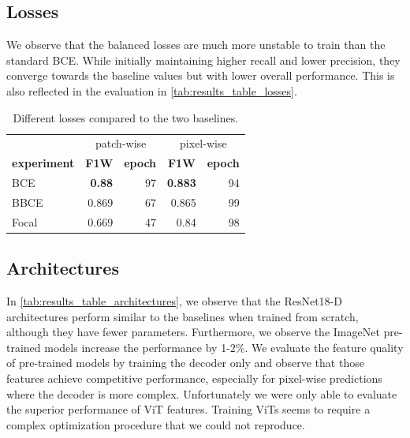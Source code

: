 \documentclass[10pt,conference,compsocconf]{IEEEtran}
\begin{document}
\subsection{Losses}
We observe that the balanced losses are much more unstable to train than the standard BCE. While initially maintaining higher recall and lower precision, they converge towards the baseline values but with lower overall performance. This is also reflected in the evaluation in \autoref{tab:results_table_losses}.
\begin{table}[ht!]
    \centering
    \begin{tabular}{l|rr|rr}
        \toprule
        \multicolumn{1}{c}{} &
        \multicolumn{2}{c}{patch-wise} &
        \multicolumn{2}{c}{pixel-wise} \\
        \multicolumn{1}{c}{\textbf{experiment}} &
        \multicolumn{1}{c}{\textbf{F1W}} &
        \multicolumn{1}{c}{\textbf{epoch}} &
        \multicolumn{1}{c}{\textbf{F1W}} &
        \multicolumn{1}{c}{\textbf{epoch}} \\
        \midrule
            BCE & \textbf{0.88} & 97 & \textbf{0.883} & 94 \\
            BBCE & 0.869 & 67 & 0.865 & 99 \\
            Focal & 0.669 & 47 & 0.84 & 98 \\
        \bottomrule
    \end{tabular}
    \caption{Different losses compared to the two baselines.}
    \label{tab:results_table_losses}
    \vspace{-0.5cm}
\end{table}

\subsection{Architectures}
In \autoref{tab:results_table_architectures}, we observe that the ResNet18-D architectures perform similar to the baselines when trained from scratch, although they have fewer parameters. Furthermore, we observe the ImageNet pre-trained models increase the performance by 1-2\%. We evaluate the feature quality of pre-trained models by training the decoder only and observe that those features achieve competitive performance, especially for pixel-wise predictions where the decoder is more complex. Unfortunately we were only able to evaluate the superior performance of ViT features. Training ViTs seems to require a complex optimization procedure that we could not reproduce.
\end{document}
